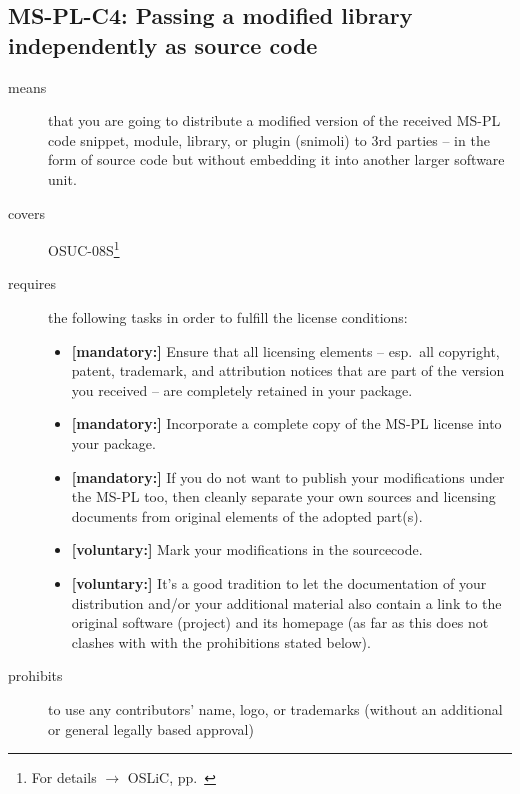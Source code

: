 \subsection{MS-PL-C4: Passing a modified library independently as source code}
\label{OSUC-08S-MS-PL}
\begin{description}
\item[means] that you are going to distribute a modified version of the received
MS-PL code snippet, module, library, or plugin (snimoli) to 3rd parties -- in
the form of source code but without embedding it into another larger software
unit.
\item[covers] OSUC-08S\footnote{For details $\rightarrow$ OSLiC, pp.\
\pageref{OSUC-08S-DEF}}
\item[requires] the following tasks in order to fulfill the license conditions:

\begin{itemize}
  \item \textbf{[mandatory:]} Ensure that all licensing elements -- esp.\ all
  copyright, patent, trademark, and attribution notices that are part of the
  version you received -- are completely retained in your package.
 
  \item \textbf{[mandatory:]} Incorporate a complete copy of the MS-PL license
  into your package.
  
  \item \textbf{[mandatory:]} If you do not want to publish your modifications
  under the MS-PL too, then cleanly separate your own sources and licensing
  documents from original elements of the adopted part(s).
  
  \item \textbf{[voluntary:]} Mark your modifications in the sourcecode.
  
  \item \textbf{[voluntary:]} It's a good tradition to let the documentation of
  your distribution and/or your additional material also contain a link to the
  original software (project) and its homepage (as far as this does not clashes
  with with the prohibitions stated below).
  
\end{itemize}

\item[prohibits] to use any contributors' name, logo, or trademarks (without an
additional or general legally based approval)

\end{description}


